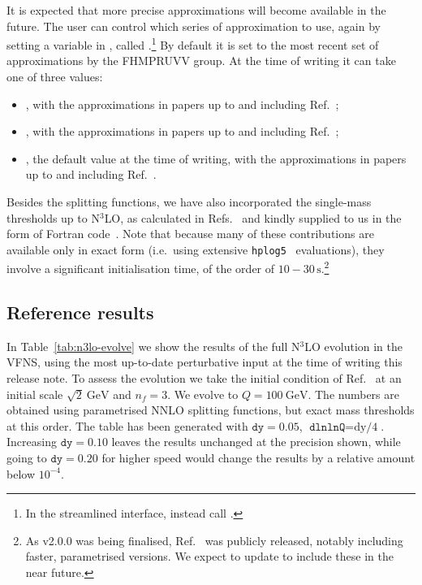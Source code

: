 It is expected that more precise approximations will become
available in the future.
%
The user can control which series of approximation to use, again by setting
a variable in , called
.\footnote{In the streamlined
  interface, instead call .}
%
By default it is set to the most recent set of approximations by
the FHMPRUVV group. At the time of writing it can take one of three values:
%
\begin{itemize}
\item {}, with the
  approximations in papers up to and including Ref.~\cite{Moch:2023tdj};
\item {}, with the
  approximations in papers up to and including
  Ref.~\cite{Falcioni:2024xyt};
\item {}, the default value at the time of
  writing, with the approximations in papers up to and including
  Ref.~\cite{Falcioni:2024qpd}.
\end{itemize}
Besides the splitting functions, we have also incorporated the
single-mass thresholds up to N$^3$LO, as calculated in
Refs.~\cite{Bierenbaum:2009mv,Ablinger:2010ty,Kawamura:2012cr,Blumlein:2012vq,ABLINGER2014263,Ablinger:2014nga,Ablinger:2014vwa,Behring:2014eya,Ablinger:2019etw,Behring:2021asx,Ablinger:2023ahe,Ablinger:2024xtt}
and kindly supplied to us in the form of Fortran
code~\cite{BlumleinCode,Fael:2022miw}.
%
Note that because many of these contributions are available only in
exact form (i.e.\ using extensive
\texttt{hplog5}~\cite{FortranPolyLog} evaluations), they involve a
significant initialisation time, of the order of
$10{-}30\,\text{s}$.\footnote{As \hoppet v2.0.0 was being finalised,
  Ref.~\cite{BlumleinCode} was publicly released, notably
  including faster, parametrised versions. We expect to update \hoppet
  to include these in the near future.}

\subsection{Reference results}

In Table~\ref{tab:n3lo-evolve} we show the results of the full N$^3$LO
evolution in the VFNS, using the most up-to-date perturbative input at
the time of writing this release note. To assess the evolution we take
the initial condition of Ref.~\cite{Dittmar:2005ed} at an initial
scale $\sqrt{2}~\text{GeV}$ and $n_f=3$. We evolve to
$Q=100~\text{GeV}$. The numbers are obtained using parametrised NNLO
splitting functions, but exact mass thresholds at this order.
%
The table has been generated with $\texttt{dy}=0.05$,
$\texttt{dlnlnQ}=\text{dy/4}$.
%
Increasing $\texttt{dy}=0.10$ leaves the results unchanged at the
precision shown, while going to $\texttt{dy}=0.20$ for higher speed
would change the results by a relative amount below $10^{-4}$.

